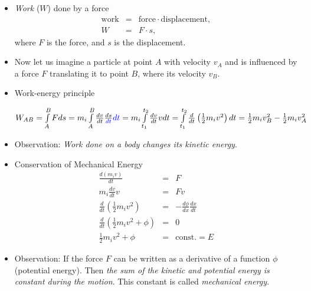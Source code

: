 \documentclass[t,aspectratio=169]{beamer}
\begin{document}
\begin{frame}
\begin{itemize}
\item \emph{Work} ($W$) done by a force
\begin{eqnarray*}
\text{work}&=&\text{force}\cdot\text{displacement}, \\
W&=&F\cdot s,
\end{eqnarray*}
where $F$ is the force, and $s$ is the displacement.
\item Now let us imagine a particle at point $A$ with velocity $v_{A}$ and is influenced by a force $F$ translating it to point $B$, where its velocity $v_{B}$.

\pagebreak
\item Work-energy principle
\begin{center}
\begin{figure}
\end{figure}
\end{center}
$ W_{AB}=\int\limits_{A}^{B}Fds=m_{i}\int\limits_{A}^{B}\frac{dv}{dt}\frac{ds}{\textcolor{blue}{dt}}\textcolor{blue}{dt}=m_{i}\int\limits_{t_{1}}^{t_{2}}\frac{dv}{dt}vdt=\int\limits_{t_{1}}^{t_{2}}\frac{d}{dt}\left(\frac{1}{2}m_{i}v^{2}\right)dt=\frac{1}{2}m_{i}v_{B}^{2}-\frac{1}{2}m_{i}v_{A}^{2}$
\item Observation: \emph{Work done on a body changes its kinetic energy}.

\pagebreak
\item Conservation of Mechanical Energy
\begin{eqnarray*}
\frac{d(m_{i}v)}{dt}&=&F \\
m_{i}\frac{dv}{dt}v&=&Fv \\
\frac{d}{dt}\left(\frac{1}{2}m_{i}v^{2}\right)&=&-\frac{d\phi}{dx}\frac{dx}{dt} \\
\frac{d}{dt}\left(\frac{1}{2}m_{i}v^{2}+\phi\right)&=&0 \\
\frac{1}{2}m_{i}v^{2}+\phi&=&\text{const.}=E
\end{eqnarray*}

\pagebreak
\item Observation: If the force $F$ can be written as a derivative of a function $\phi$ (potential energy). Then \emph{the sum of the kinetic and potential energy is constant during the motion}. This constant is called \emph{mechanical energy}.


\end{itemize}
\end{frame}
\end{document}
